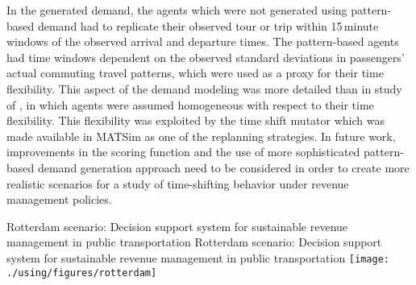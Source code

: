 In the generated demand, the agents which were not generated using pattern-based demand had to replicate their observed tour or trip within 15\,minute windows of the observed arrival and departure times. The pattern-based agents had time windows dependent on the observed standard deviations in passengers' actual commuting travel patterns, which were used as a proxy for their time flexibility. This aspect of the demand modeling was more detailed than in study of \citet[][]{LovricEtAl_DSS_2013}, in which agents were assumed homogeneous with respect to their time flexibility. This flexibility was exploited by the time shift mutator which was made available in MATSim as one of the replanning strategies. In future work, improvements in the scoring function and the use of more sophisticated pattern-based demand generation approach need to be considered in order to create more realistic scenarios for a study of time-shifting behavior under revenue management policies.

\createfigure%
{Rotterdam scenario: Decision support system for sustainable revenue management in public transportation}%
{Rotterdam scenario: Decision support system for sustainable revenue management in public transportation}%
{\label{fig:rotterdam}}%
{\texttt{[image: ./using/figures/rotterdam]}}%
{}


